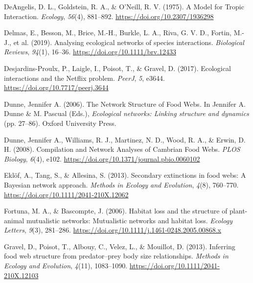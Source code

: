 \documentclass[
]{agujournal2019}
\newlength{\cslhangindent}
\newenvironment{CSLReferences}[2] %
 {\begin{list}{}{%
  \setlength{\itemindent}{0pt}
  \setlength{\leftmargin}{0pt}
  \setlength{\parsep}{0pt}
  \ifodd #1
   \setlength{\leftmargin}{\cslhangindent}
   \setlength{\itemindent}{-1\cslhangindent}
  \fi
  \setlength{\itemsep}{#2\baselineskip}}}
 {\end{list}}
\begin{document}
\begin{CSLReferences}{1}{0}
DeAngelis, D. L., Goldstein, R. A., \& O'Neill, R. V. (1975). A {Model}
for {Tropic Interaction}. \emph{Ecology}, \emph{56}(4), 881--892.
\url{https://doi.org/10.2307/1936298}

Delmas, E., Besson, M., Brice, M.-H., Burkle, L. A., Riva, G. V. D.,
Fortin, M.-J., et al. (2019). Analysing ecological networks of species
interactions. \emph{Biological Reviews}, \emph{94}(1), 16--36.
\url{https://doi.org/10.1111/brv.12433}

Desjardins-Proulx, P., Laigle, I., Poisot, T., \& Gravel, D. (2017).
Ecological interactions and the {Netflix} problem. \emph{PeerJ},
\emph{5}, e3644. \url{https://doi.org/10.7717/peerj.3644}

Dunne, Jennifer A. (2006). The {Network Structure} of {Food Webs}. In
Jennifer A. Dunne \& M. Pascual (Eds.), \emph{Ecological networks:
{Linking} structure and dynamics} (pp. 27--86). Oxford University Press.

Dunne, Jennifer A., Williams, R. J., Martinez, N. D., Wood, R. A., \&
Erwin, D. H. (2008). Compilation and {Network Analyses} of {Cambrian
Food Webs}. \emph{PLOS Biology}, \emph{6}(4), e102.
\url{https://doi.org/10.1371/journal.pbio.0060102}

Eklöf, A., Tang, S., \& Allesina, S. (2013). Secondary extinctions in
food webs: A {Bayesian} network approach. \emph{Methods in Ecology and
Evolution}, \emph{4}(8), 760--770.
\url{https://doi.org/10.1111/2041-210X.12062}

Fortuna, M. A., \& Bascompte, J. (2006). Habitat loss and the structure
of plant-animal mutualistic networks: {Mutualistic} networks and habitat
loss. \emph{Ecology Letters}, \emph{9}(3), 281--286.
\url{https://doi.org/10.1111/j.1461-0248.2005.00868.x}

Gravel, D., Poisot, T., Albouy, C., Velez, L., \& Mouillot, D. (2013).
Inferring food web structure from predator--prey body size
relationships. \emph{Methods in Ecology and Evolution}, \emph{4}(11),
1083--1090. \url{https://doi.org/10.1111/2041-210X.12103}


\end{CSLReferences}
\end{document}
